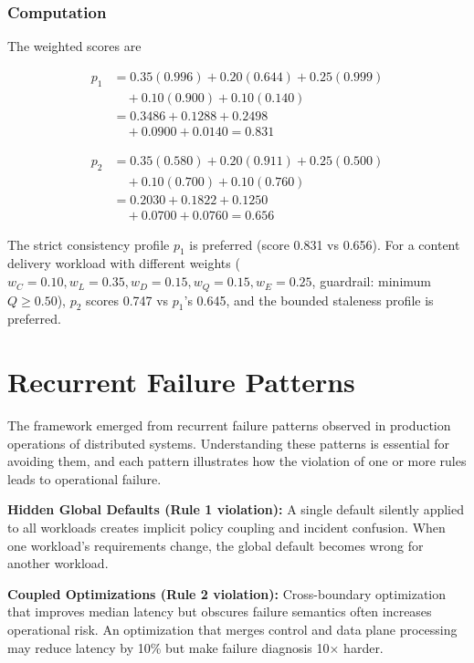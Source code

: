 \documentclass[conference]{IEEEtran}
\begin{document}
\subsubsection{Computation}

The weighted scores are

\begin{align}
p_1 &= 0.35(0.996)+0.20(0.644)+0.25(0.999) \nonumber\\
    &\quad +0.10(0.900)+0.10(0.140) \nonumber\\
    &=0.3486+0.1288+0.2498 \nonumber\\
    &\quad +0.0900+0.0140=0.831
\end{align}

\begin{align}
p_2 &=0.35(0.580)+0.20(0.911)+0.25(0.500) \nonumber\\
    &\quad +0.10(0.700)+0.10(0.760) \nonumber\\
    &=0.2030+0.1822+0.1250 \nonumber\\
    &\quad +0.0700+0.0760=0.656
\end{align}

The strict consistency profile $p_1$ is preferred (score 0.831 vs 0.656). For a content delivery workload with different weights ($w_C = 0.10, w_L = 0.35, w_D = 0.15, w_Q = 0.15, w_E = 0.25$, guardrail: minimum $Q \geq 0.50$), $p_2$ scores 0.747 vs $p_1$'s 0.645, and the bounded staleness profile is preferred.

\section{Recurrent Failure Patterns}
\label{sec:patterns}
The framework emerged from recurrent failure patterns observed in production operations of distributed systems. Understanding these patterns is essential for avoiding them, and each pattern illustrates how the violation of one or more rules leads to operational failure.

\textbf{Hidden Global Defaults (Rule 1 violation):} A single default silently applied to all workloads creates implicit policy coupling and incident confusion. When one workload's requirements change, the global default becomes wrong for another workload.

\medskip

\noindent\textbf{Coupled Optimizations (Rule 2 violation):} Cross-boundary optimization that improves median latency but obscures failure semantics often increases operational risk. An optimization that merges control and data plane processing may reduce latency by 10\% but make failure diagnosis 10$\times$ harder.
\end{document}
